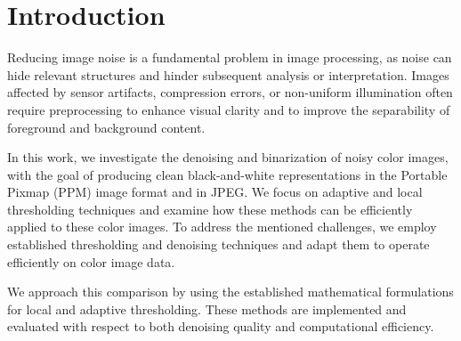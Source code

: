 \section{Introduction}\label{sec:introduction}

Reducing image noise is a fundamental problem in image processing, as noise can hide relevant structures and hinder subsequent analysis or interpretation. 
Images affected by sensor artifacts, compression errors, or non-uniform illumination often require preprocessing to enhance visual clarity and to improve the separability of foreground and background content.

In this work, we investigate the denoising and binarization of noisy color images, with the goal of producing clean black-and-white representations in the Portable Pixmap (PPM) image format and in JPEG.
We focus on adaptive and local thresholding techniques and examine how these methods can be efficiently applied to these color images.
To address the mentioned challenges, we employ established thresholding and denoising techniques and adapt them to operate efficiently on color image data. 

We approach this comparison by using the established mathematical formulations for local and adaptive thresholding. 
These methods are implemented and evaluated with respect to both denoising quality and computational efficiency.
